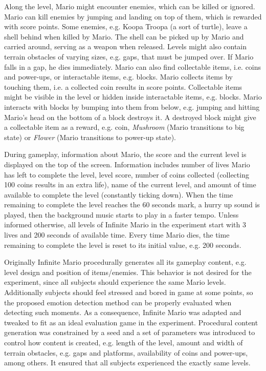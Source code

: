 Along the level, Mario might encounter enemies, which can be killed or ignored. Mario can kill enemies by jumping and landing on top of them, which is rewarded with score points. Some enemies, e.g. Koopa Troopa (a sort of turtle), leave a shell behind when killed by Mario. The shell can be picked up by Mario and carried around, serving as a weapon when released. Levels might also contain terrain obstacles of varying sizes, e.g. gaps, that must be jumped over. If Mario falls in a gap, he dies immediately. Mario can also find collectable items, i.e. coins and power-ups, or interactable items, e.g. blocks. Mario collects items by touching them, i.e. a collected coin results in score points. Collectable items might be visible in the level or hidden inside interactable items, e.g. blocks. Mario interacts with blocks by bumping into them from below, e.g. jumping and hitting Mario's head on the bottom of a block destroys it. A destroyed block might give a collectable item as a reward, e.g. coin, \textit{Mushroom} (Mario transitions to big state) or \textit{Flower} (Mario transitions to power-up state).

During gameplay, information about Mario, the score and the current level is displayed on the top of the screen. Information includes number of lives Mario has left to complete the level, level score, number of coins collected (collecting 100 coins results in an extra life), name of the current level, and amount of time available to complete the level (constantly ticking down). When the time remaining to complete the level reaches the 60 seconds mark, a hurry up sound is played, then the background music starts to play in a faster tempo. Unless informed otherwise, all levels of Infinite Mario in the experiment start with 3 lives and 200 seconds of available time. Every time Mario dies, the time remaining to complete the level is reset to its initial value, e.g. 200 seconds.

Originally Infinite Mario procedurally generates all its gameplay content, e.g. level design and position of items/enemies. This behavior is not desired for the experiment, since all subjects should experience the same Mario levels. Additionally subjects should feel stressed and bored in game at some points, so the proposed emotion detection method can be properly evaluated when detecting such moments. As a consequence, Infinite Mario was adapted and tweaked to fit as an ideal evaluation game in the experiment. Procedural content generation was constrained by a seed and a set of parameters was introduced to control how content is created, e.g. length of the level, amount and width of terrain obstacles, e.g. gaps and platforms, availability of coins and power-ups, among others. It ensured that all subjects experienced the exactly same levels.

